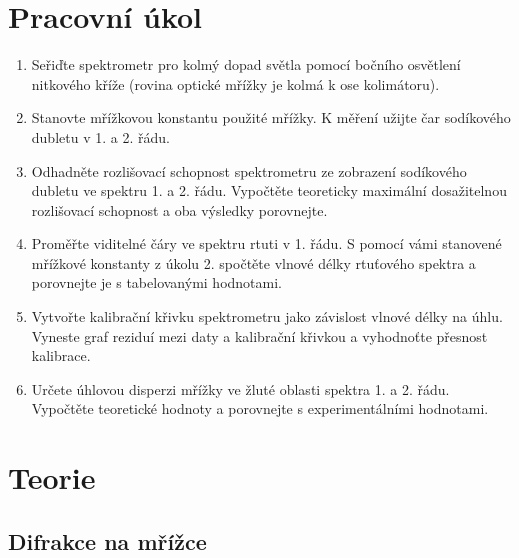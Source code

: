 \documentclass{../concepts/titul_protokol_p/prepareprotokol} %
\begin{document}
\renewcommand{\figurename}{Graf}
\renewcommand{\refname}{Literatura}

\graphicspath{{../concepts/titul_protokol_p/}}
\maketitle

\section{Pracovní úkol}
\begin{enumerate}
    \item Seřiďte spektrometr pro kolmý dopad světla pomocí bočního osvětlení nitkového kříže (rovina optické mřížky je kolmá k ose kolimátoru).
    \item Stanovte mřížkovou konstantu použité mřížky. K měření užijte čar sodíkového dubletu v 1. a 2. řádu.
    \item Odhadněte rozlišovací schopnost spektrometru ze zobrazení sodíkového dubletu ve spektru 1. a 2. řádu. Vypočtěte teoreticky maximální dosažitelnou rozlišovací schopnost a oba výsledky porovnejte.
    \item Proměřte viditelné čáry ve spektru rtuti v 1. řádu. S pomocí vámi stanovené mřížkové konstanty z úkolu 2. spočtěte vlnové délky rtuťového spektra a porovnejte je s tabelovanými hodnotami.
    \item Vytvořte kalibrační křivku spektrometru jako závislost vlnové délky na úhlu. Vyneste graf reziduí mezi daty a kalibrační křivkou a vyhodnoťte přesnost kalibrace.
    \item Určete úhlovou disperzi mřížky ve žluté oblasti spektra 1. a 2. řádu. Vypočtěte teoretické hodnoty a porovnejte s experimentálními hodnotami.
\end{enumerate}

\section{Teorie}
\subsection{Difrakce na mřížce}
\end{document}
